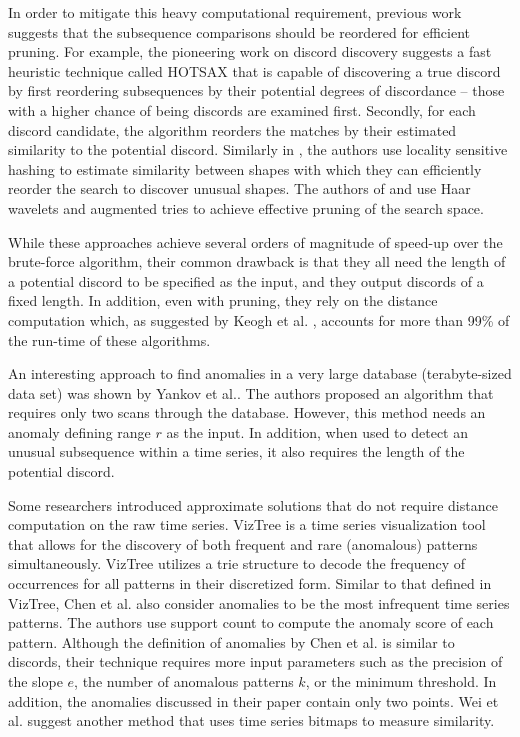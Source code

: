 \documentclass{llncs}
\begin{document}
In order to mitigate this heavy computational requirement, previous work suggests that the subsequence comparisons should be reordered for efficient pruning. For example, the pioneering work on discord discovery suggests a fast heuristic technique called HOTSAX \cite{hot_sax} that is capable of discovering a true discord by first reordering subsequences by their potential degrees of discordance -- those with a higher chance of being discords are examined first. Secondly, for each discord candidate, the algorithm reorders the matches by their estimated similarity to the potential discord. Similarly in \cite{hashing}, the authors use locality sensitive hashing to estimate similarity between shapes with which they can efficiently reorder the search to discover unusual shapes. The authors of \cite{haar_1} and \cite{haar_2} use Haar wavelets and augmented tries to achieve effective pruning of the search space.


While these approaches achieve several orders of magnitude of speed-up over the brute-force algorithm, their common drawback is that they all need the length of a potential discord to be specified as the input,  and they output discords of a fixed length. %
In addition, even with pruning, they rely on the distance computation which, as suggested by Keogh et al.  \cite{hot_sax}, accounts for more than 99\% of the run-time of these algorithms.  

An interesting approach to find anomalies in a very large database (terabyte-sized data set) was shown by Yankov et al.\cite{disk}. The authors proposed an algorithm that requires only two scans through the database. However, this method needs an anomaly defining range $r$ as the input. In addition, when used to detect an unusual subsequence within a time series, it also requires the length of the potential discord.

Some researchers introduced approximate solutions that do not require distance computation on the raw time series. VizTree \cite{viztree} is a time series visualization tool that allows for the discovery of both frequent and rare (anomalous) patterns simultaneously. VizTree utilizes a trie structure to decode the frequency of occurrences for all patterns in their discretized form. Similar to that defined in VizTree, Chen et al.\cite{ano_pattern} also consider anomalies to be the most infrequent time series patterns. The authors use support count to compute the anomaly score of each pattern. Although the definition of anomalies by Chen et al. is similar to discords, their technique requires more input parameters such as the precision of the slope $e$, the number of anomalous patterns $k$, or the minimum threshold. In addition, the anomalies discussed in their paper contain only two points. Wei et al. \cite{bitmaps} suggest another method that uses time series bitmaps to measure similarity. 
\end{document}
